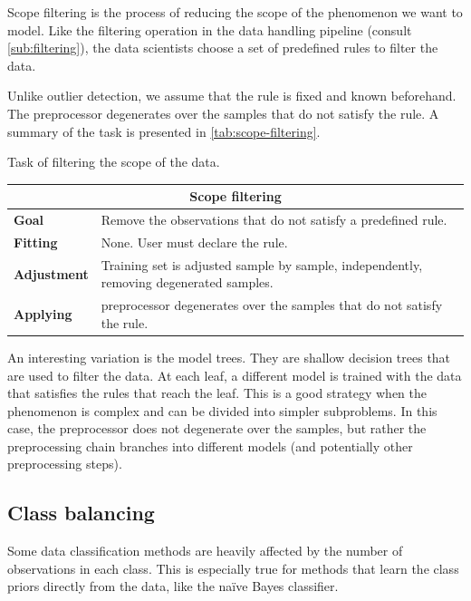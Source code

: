 Scope filtering is the process of reducing the scope of the phenomenon we want to model.
Like the filtering operation in the data handling pipeline (consult \cref{sub:filtering}),
the data scientists choose a set of predefined rules to filter the data.

Unlike outlier detection, we assume that the rule is fixed and known beforehand.  The
\gls{preprocessor} degenerates over the samples that do not satisfy the rule.  A summary of the
task is presented in \cref{tab:scope-filtering}.

\begin{tablebox}[label=tab:scope-filtering]{Task of filtering the scope of the data.}
  \centering
  \begin{tabular}{lp{6cm}}
    \toprule
    \multicolumn{2}{c}{\textbf{Scope filtering}} \\
    \midrule
    \textbf{Goal} &
      Remove the observations that do not satisfy a predefined rule. \\
    \textbf{Fitting} &
      None. User must declare the rule. \\
    \textbf{Adjustment} &
      Training set is adjusted sample by sample, independently, removing degenerated
      samples. \\
    \textbf{Applying} &
      \Gls{preprocessor} degenerates over the samples that do not satisfy the rule. \\
    \bottomrule
  \end{tabular}
\end{tablebox}

An interesting variation is the model trees.  They are shallow
decision trees that are used to filter the data.  At each leaf, a different model is
trained with the data that satisfies the rules that reach the leaf.  This is a good
strategy when the phenomenon is complex and can be divided into simpler subproblems.
In this case, the \gls{preprocessor} does not degenerate over the samples, but rather the
preprocessing chain branches into different models (and potentially other preprocessing
steps).

\subsection{Class balancing}

Some data classification methods are heavily affected by the number of observations in each
class.  This is especially true for methods that learn the class priors directly from the
data, like the naïve Bayes \gls{classifier}.

